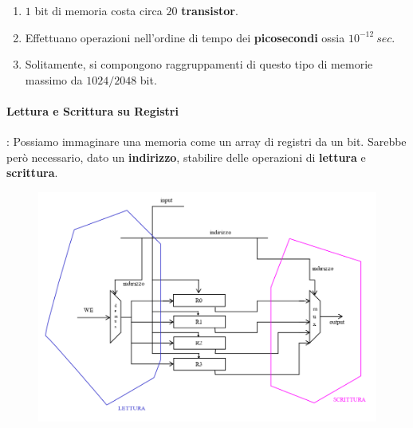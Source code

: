 \documentclass{article}
\begin{document}
\begin{enumerate}
    \item $1$ bit di memoria costa circa $20$ \textbf{transistor}.
    \item Effettuano operazioni nell'ordine di tempo dei \textbf{picosecondi} ossia $10^{-12} \:sec$.
    \item Solitamente, si compongono raggruppamenti di questo tipo di memorie massimo da $1024/2048$ bit.
\end{enumerate}

\paragraph{Lettura e Scrittura su Registri}: Possiamo immaginare una memoria come un array di registri da un bit. Sarebbe però necessario, dato un \textbf{indirizzo}, stabilire delle operazioni di \textbf{lettura} e \textbf{scrittura}.

\begin{figure}[htbp]
    \includegraphics[scale=0.3]{img/letturaScritturaReg.png}
    \centering
\end{figure}
\end{document}
